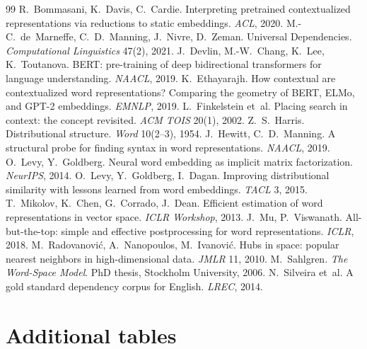 \documentclass[11pt,a4paper]{article}
\begin{document}
\FloatBarrier
\begin{thebibliography}{99}\setlength{\itemsep}{0pt}\small
{} R.~Bommasani, K.~Davis, C.~Cardie. Interpreting pretrained contextualized representations via reductions to static embeddings. \emph{ACL}, 2020.
 M.-C.~de~Marneffe, C.~D.~Manning, J.~Nivre, D.~Zeman. Universal Dependencies. \emph{Computational Linguistics} 47(2), 2021.
 J.~Devlin, M.-W.~Chang, K.~Lee, K.~Toutanova. BERT: pre-training of deep bidirectional transformers for language understanding. \emph{NAACL}, 2019.
 K.~Ethayarajh. How contextual are contextualized word representations? Comparing the geometry of BERT, ELMo, and GPT-2 embeddings. \emph{EMNLP}, 2019.
 L.~Finkelstein et~al. Placing search in context: the concept revisited. \emph{ACM TOIS} 20(1), 2002.
 Z.~S.~Harris. Distributional structure. \emph{Word} 10(2--3), 1954.
 J.~Hewitt, C.~D.~Manning. A structural probe for finding syntax in word representations. \emph{NAACL}, 2019.
 O.~Levy, Y.~Goldberg. Neural word embedding as implicit matrix factorization. \emph{NeurIPS}, 2014.
 O.~Levy, Y.~Goldberg, I.~Dagan. Improving distributional similarity with lessons learned from word embeddings. \emph{TACL} 3, 2015.
 T.~Mikolov, K.~Chen, G.~Corrado, J.~Dean. Efficient estimation of word representations in vector space. \emph{ICLR Workshop}, 2013.
 J.~Mu, P.~Viswanath. All-but-the-top: simple and effective postprocessing for word representations. \emph{ICLR}, 2018.
 M.~Radovanovi\'c, A.~Nanopoulos, M.~Ivanovi\'c. Hubs in space: popular nearest neighbors in high-dimensional data. \emph{JMLR} 11, 2010.
 M.~Sahlgren. \emph{The Word-Space Model}. PhD thesis, Stockholm University, 2006.
 N.~Silveira et~al. A gold standard dependency corpus for English. \emph{LREC}, 2014.
\end{thebibliography}

\clearpage
\appendix
{}\section{Additional tables}\label{app:tabs}
\begin{table}[h]\centering\footnotesize\setlength{\tabcolsep}{4pt}
\caption{Layer sweep for pooled static vectors (covered items; pool = 660 sentences), with contextual references.}\end{table}
\end{document}
